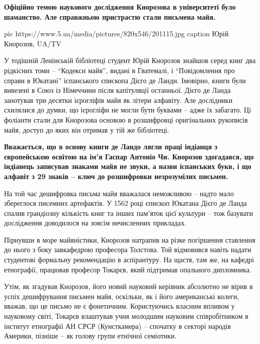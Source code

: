 \begin{leftbar}
  \bfseries
Офіційно темою наукового дослідження Кнорозова в університеті було
шаманство. Але справжньою пристрастю стали письмена майя.
\end{leftbar}

\ifcmt
pic https://www.5.ua/media/pictures/820x546/201115.jpg
caption Юрій Кнорозов, UA/TV
\fi

У тодішній Ленінській бібліотеці студент Юрій Кнорозов знайшов серед книг
два рідкісних томи – \enquote{Кодекси майя}, видані в Гватемалі, і 
\enquote{Повідомлення
про справи в Юкатані} іспанського єпископа Дієго де Ланди. Імовірно, книги
були вивезені в Союз із Німеччини після капітуляції останньої. Дієго де
Ланда занотував три десятки ієрогліфів майя як літери алфавіту. Але
дослідники схилялися до думки, що ієрогліфи не могли бути буквами – адже
їх забагато. Ці фоліанти стали для Кнорозова основою в розшифровці
оригінальних рукописів майя, доступ до яких він отримав у тій же
бібліотеці.

\begin{leftbar}
  \bfseries
Вважається, що в основу книги де Ландо лягли праці індіанця з
європейською освітою на ім'я Гаспар Антоніо Чи. Кнорозов здогадався, що
індіанець записував знаками майя не звуки, а назви іспанських букв, і що
алфавіт з 29 знаків – ключ до розшифровки незрозумілих письмен.
\end{leftbar}

На той час дешифровка письма майя вважалася неможливою – надто мало
збереглося писемних артефактів. У 1562 році єпископ Юкатана Дієго де Ланда
спалив грандіозну кількість книг та інших пам'яток цієї культури – тож
базувати дослідження доводилося на зовсім нечисленних прикладах.

Пірнувши в море майяністики, Кнорозов натрапив на різке погіршення
ставлення до нього з боку завкафедрою професора Толстова. Той відмовився
навіть надати студентові формальну рекомендацію в аспірантуру. На щастя,
там же, на кафедрі етнографії, працював професор Токарєв, який підтримав
опального дипломника.

Утім, як згадував Кнорозов, його новий науковий керівник абсолютно не
вірив в успіх дешифрування письмен майя, оскільки, як і його американські
колеги, вважав, що це письмо не є фонетичним. Користуючись власним впливом
у науковому світі, Токарєв влаштував учня молодшим науковим співробітником
в інститут етнографії АН СРСР (Кунсткамера) – спочатку в секторі народів
Америки, пізніше – як голову групи етнічної семіотики.

